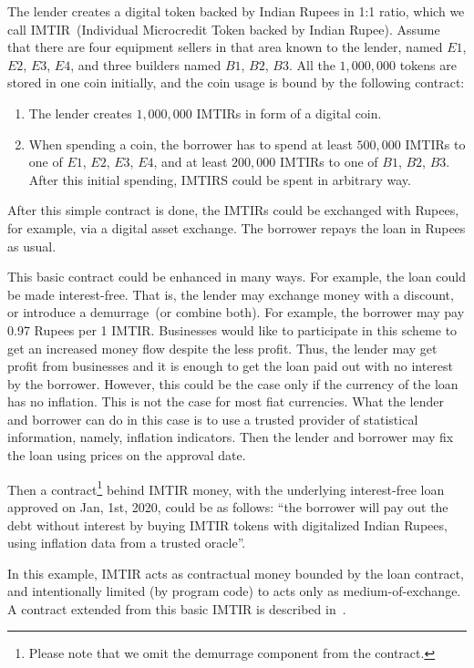 \documentclass[]{llncs}   %
\begin{document}
 The lender creates a digital token backed by Indian Rupees in 1:1 ratio, which we call IMTIR~(Individual Microcredit Token backed by Indian Rupee). Assume that there are four equipment sellers in that area known to the lender, named $E1$, $E2$, $E3$, $E4$, and three builders named $B1$, $B2$, $B3$. All the $1,000,000$ tokens are stored in one coin initially, and the coin usage is bound by the following contract:

 \begin{enumerate}
    \item{} The lender creates $1,000,000$ IMTIRs in form of a digital coin.
    \item{} When spending a coin, the borrower has to spend at least $500,000$ IMTIRs to one of $E1$, $E2$, $E3$, $E4$, and at least $200,000$ IMTIRs to one of $B1$, $B2$, $B3$. After this initial spending, IMTIRS could be spent in arbitrary way.
\end{enumerate}

 After this simple contract is done, the IMTIRs could be exchanged with Rupees, for example, via a digital asset exchange. The borrower repays the loan in Rupees as usual. 

 This basic contract could be enhanced in many ways. For example, the loan could be made interest-free. That is,
 the lender may exchange money with a discount, or introduce a demurrage~(or combine both). For example, the borrower may pay 0.97 Rupees per 1 IMTIR. Businesses would like to participate in this scheme to get an increased money flow despite the less profit. Thus, the lender may get profit from businesses and it is enough to get the loan paid out with no interest by the borrower. However, this could be the case only if the currency of the loan has no inflation. This is not the case for most fiat currencies. What the lender and borrower can do in this case is to use a trusted provider of statistical information, namely, inflation indicators. Then the lender and borrower may fix the loan using prices on the approval date.

 Then a contract\footnote{Please note that we omit the demurrage component from
 the contract.} behind IMTIR money, with the underlying interest-free loan approved on Jan, 1st, 2020,
 could be as follows: ``the borrower will pay out the debt without interest by buying IMTIR tokens with digitalized Indian Rupees, using inflation data from a trusted oracle''.
 
 In this example, IMTIR acts as contractual money bounded by the loan contract, and intentionally limited (by program code) to acts only as medium-of-exchange. A contract extended from this basic IMTIR is described in~\cite{scpeople}.
\end{document}
